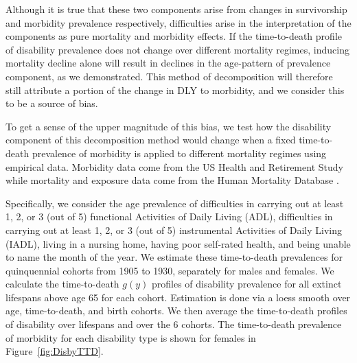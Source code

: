 \documentclass[11pt,oneside,a4paper]{article} %
\begin{document}
Although it is true that these two components arise from changes in survivorship
and morbidity prevalence respectively, difficulties arise in the interpretation
of the components as pure mortality and morbidity effects. If the time-to-death
profile of disability prevalence does not change over different mortality
regimes, inducing mortality decline alone will result in declines in the
age-pattern of prevalence component, as we demonstrated. This method of
decomposition will therefore still attribute a portion of the
change in DLY to morbidity, and we consider this to be a source of bias.

To get a sense of the upper magnitude of this bias, we test how the disability
component of this decomposition method would change when a fixed time-to-death
prevalence of morbidity is applied to different mortality regimes using empirical data. Morbidity data come from the US Health and Retirement Study while mortality and exposure data come from the Human Mortality Database \citep{HMD2015}.

Specifically, we consider the age prevalence of difficulties in carrying out at
least 1, 2, or 3 (out of 5) functional Activities of Daily Living (ADL),
difficulties in carrying out at least 1, 2, or 3 (out of 5) instrumental
Activities of Daily Living (IADL), living in a nursing home, having poor
self-rated health, and being unable to name the month of the year. We estimate
these time-to-death prevalences for quinquennial cohorts from 1905 to 1930,
separately for males and females. We calculate the time-to-death $g(y)$ profiles of
disability prevalence for all extinct lifespans above age 65 for each cohort.
Estimation is done via a loess smooth over age, time-to-death, and birth
cohorts. We
then average the time-to-death profiles of disability over lifespans and over the 6 cohorts.
 The time-to-death prevalence of morbidity for
each disability type is shown for females in Figure~\ref{fig:DisbyTTD}.
\end{document}
